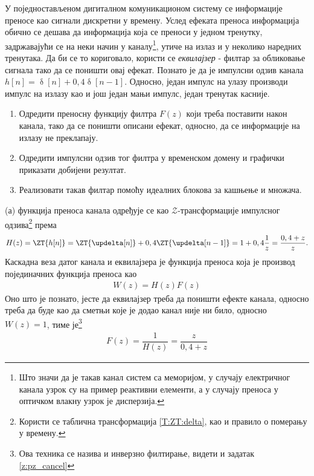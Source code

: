 \PID
У поједностављеном дигиталном комуникационом систему се информације преносе као сигнали дискретни у времену. 
Услед ефеката преноса информација обично се дешава да информација која се 
преноси у једном тренутку, задржавајући се на неки начин у каналу\footnote{Што значи да је такав канал систем са меморијом, у случају 
електричног канала узрок су на пример реактивни елементи, а у случају преноса у оптичком влакну узрок је дисперзија.}, утиче на излаз и у неколико наредних 
тренутака. Да би се то кориговало, користи се \textit{еквилајзер} - филтар за обликовање сигнала тако да се поништи овај ефекат. Познато је да је импулсни
одзив канала $h[n] = \updelta[n] + 0,4 \updelta[n-1]$. Односно, један импулс на улазу производи импулс на излазу као и још један мањи импулс, један 
тренутак касније. 
\begin{enumerate}[label=(\alph*)]
\item Одредити преносну функцију филтра $F(z)$ који треба поставити након канала, тако да се поништи описани ефекат, односно, да се информације на 
излазу не преклапају. 
\item Одредити импулсни одзив тог филтра у временском домену и графички приказати добијени резултат. 
\item Реализовати такав филтар помоћу идеалних блокова за кашњење и множача. 
\end{enumerate}

\RESENJE
(а) функција преноса канала одређује се као $\mathcal{Z}$-трансформације импулсног одзива\footnote{
    Користи се таблична трансформација \ref{T:ZT:delta}, као и правило о померању у времену. 
} према 
\begin{eqnarray}
    H(z) = \ZT{h[n]} = \ZT{\updelta[n]} + 0,4 \ZT{\updelta[n-1]} 
                     = 1 + 0,4\dfrac{1}{z} = \dfrac{0,4 + z}{z}.
\end{eqnarray}
Каскадна веза датог канала и еквилајзера је функција преноса која је производ појединачних функција преноса као 
\begin{eqnarray}
    W(z) = H(z) F(z)
\end{eqnarray}
Оно што је познато, јесте да еквилајзер треба да поништи ефекте канала, односно треба да буде као да сметњи које је додао канал није ни било, 
односно $W(z) = 1$, тиме је\footnote{Ова техника се назива и инверзно филтирање, видети и задатак \ref{z:pz_cancel}}
\begin{eqnarray}
    F(z) = \dfrac{1}{H(z)} = \dfrac{z}{0,4 + z}
\end{eqnarray}

